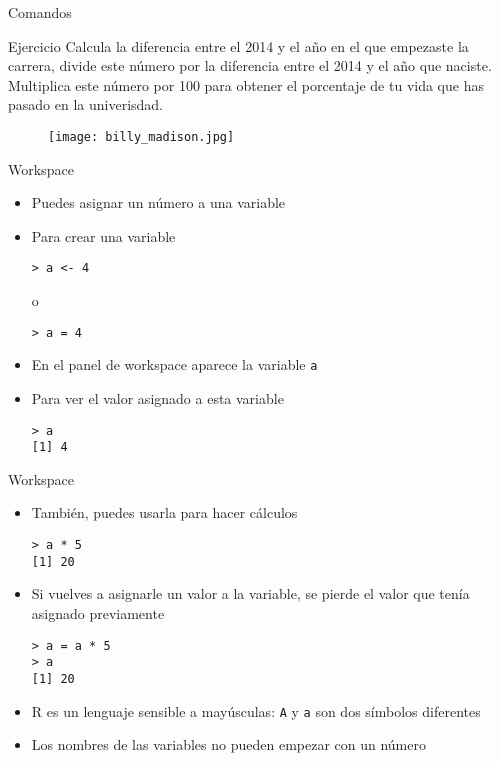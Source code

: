 \documentclass{beamer}
\begin{document}
\begin{frame}[fragile]{Comandos}
\begin{block}{Ejercicio}
Calcula la diferencia entre el 2014 y el año en el que empezaste la carrera, divide este número por la diferencia entre el 2014 y el año que naciste. Multiplica este número por 100 para obtener el porcentaje de tu vida que has pasado en la univerisdad.
\end{block}
\begin{figure}[H]
\centering
\texttt{[image: billy\_madison.jpg]}
\end{figure}
\end{frame}


\begin{frame}[fragile]{Workspace}
\begin{itemize}
\item Puedes asignar un número a una variable
\item Para crear una variable 
\begin{verbatim}
> a <- 4
\end{verbatim}
o
\begin{verbatim}
> a = 4
\end{verbatim}
\item En el panel de workspace aparece la variable \verb=a=
\item Para ver el valor asignado a esta variable
\begin{verbatim}
> a
[1] 4
\end{verbatim}
\end{itemize}
\end{frame}

\begin{frame}[fragile]{Workspace}
\begin{itemize}
\item También, puedes usarla para hacer cálculos
\begin{verbatim}
> a * 5
[1] 20
\end{verbatim}
\item Si vuelves a asignarle un valor a la variable, se pierde el valor que tenía asignado previamente
\begin{verbatim}
> a = a * 5
> a
[1] 20
\end{verbatim}
\item R es un lenguaje sensible a mayúsculas: \verb=A= y \verb=a= son dos símbolos diferentes
\item Los nombres de las variables no pueden empezar con un número
\end{itemize}
\end{frame}
\end{document}
